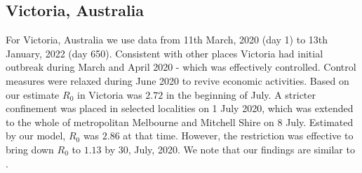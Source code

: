 \documentclass[10pt]{wlscirep}
\begin{document}
\subsection*{Victoria, Australia}
For Victoria, Australia we use data from 11th March, 2020 (day 1) to 13th January, 2022 (day 650). Consistent with other places Victoria had initial outbreak during March and April 2020 - which was effectively controlled.  Control measures were relaxed during June 2020 to revive economic activities.  Based on our estimate $R_0$ in Victoria was $2.72$ in the beginning of July.  A stricter confinement was placed in selected localities on 1 July 2020, which was extended to the whole of metropolitan Melbourne and Mitchell Shire on 8 July. Estimated by our model, $R_0$ was $2.86$ at that time. However, the restriction was effective to bring down $R_0$ to $1.13$ by 30, July, 2020. We note that our findings are similar to \cite{Saul2020}. 
\end{document}
